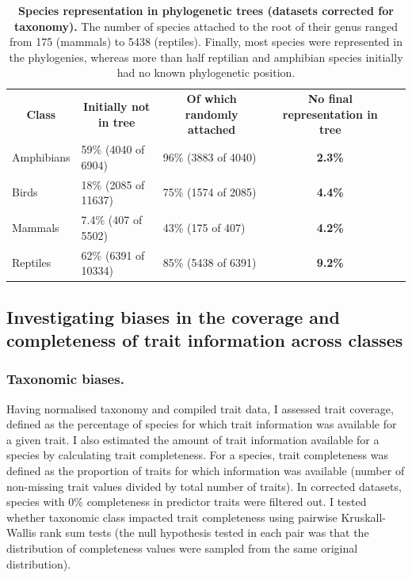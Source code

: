 \begin{table}[h!]
\renewcommand{\baselinestretch}{1}
\renewcommand{\arraystretch}{1.5}
\begin{center}\fontsize{9}{11}\selectfont
\caption[Species representation in phylogenetic trees (datasets corrected for taxonomy)]{\textbf{Species representation in phylogenetic trees (datasets corrected for taxonomy).} The number of species attached to the root of their genus ranged from 175 (mammals) to 5438 (reptiles). Finally, most species were represented in the phylogenies, whereas more than half reptilian and amphibian species initially had no known phylogenetic position.} 
\label{random_attachments_phy}
\begin{tabular}{|l|l|l|c|l}
\cline{1-4}
\multicolumn{1}{|c|}{\textbf{Class}} & \multicolumn{1}{c|}{\textbf{Initially not in tree}} & \multicolumn{1}{c|}{\textbf{Of which randomly attached}} & \textbf{No final representation in tree} &  \\ \cline{1-4}
Amphibians                  & 59\% (4040 of 6904)                           & 96\% (3883 of 4040)                     & \textbf{2.3\%}             &  \\ \cline{1-4}
Birds                       & 18\% (2085 of 11637)                          & 75\% (1574 of 2085)                    & \textbf{4.4\%}             &  \\ \cline{1-4}
Mammals                     & 7.4\% (407 of 5502)                           & 43\% (175 of 407)                       & \textbf{4.2\%}            &  \\ \cline{1-4}
Reptiles                    & 62\% (6391 of 10334)                          & 85\% (5438 of 6391)                    & \textbf{9.2\%}             &  \\ \cline{1-4}
\end{tabular}
\end{center}
\end{table}


\subsection{Investigating biases in the coverage and completeness of trait information across classes}

\subsubsection{Taxonomic biases.}
Having normalised taxonomy and compiled trait data, I assessed trait coverage, defined as the percentage of species for which trait information was available for a given trait. I also estimated the amount of trait information available for a species by calculating trait completeness. For a species, trait completeness was defined as the proportion of traits for which information was available (number of non-missing trait values divided by total number of traits). In corrected datasets, species with 0\% completeness in predictor traits were filtered out. I tested whether taxonomic class impacted trait completeness using pairwise Kruskall-Wallis rank sum tests (the null hypothesis tested in each pair was that the distribution of completeness values were sampled from the same original distribution).

